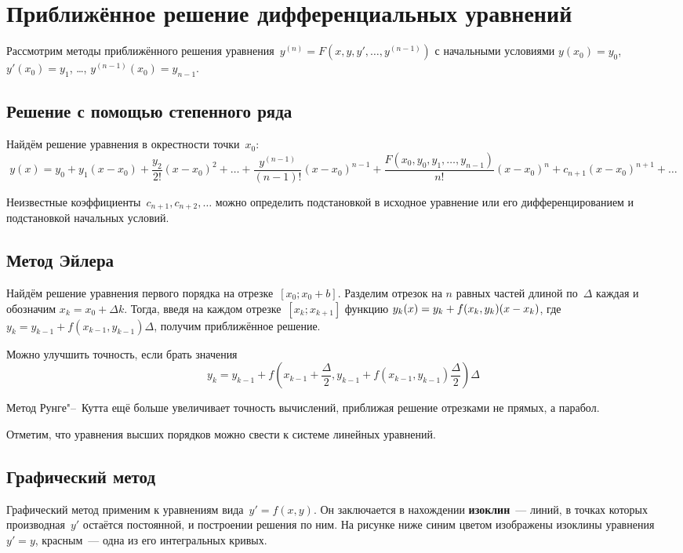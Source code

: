 \section{Приближённое решение дифференциальных уравнений}
Рассмотрим методы приближённого решения уравнения~$y^{(n)} = F(x, y, y', \ldots, y^{(n-1)})$ с начальными условиями $y(x_0) = y_0$, $y'(x_0) = y_1$, \ldots, $y^{(n-1)}(x_0) = y_{n-1}$.

\subsection{Решение с помощью степенного ряда}
Найдём решение уравнения в окрестности точки~$x_0$:
\begin{equation*}
y(x) = y_0 + y_1(x - x_0) + \frac{y_2}{2!} (x - x_0)^2 + \ldots + \frac{y^{(n-1)}}{(n - 1)!} (x - x_0)^{n-1} + \frac{F(x_0, y_0, y_1, \ldots, y_{n-1})}{n!} (x - x_0)^n + c_{n+1} (x - x_0)^{n+1} + \ldots
\end{equation*}

Неизвестные коэффициенты~$c_{n+1}, c_{n+2}, \ldots$ можно определить подстановкой в исходное уравнение или его дифференцированием и подстановкой начальных условий.

\subsection{Метод Эйлера}
 Найдём решение уравнения первого порядка на отрезке~$[x_0; x_0 + b]$.
Разделим отрезок на $n$ равных частей длиной по~$\Delta$ каждая и обозначим $x_k = x_0 + \Delta k$.
Тогда, введя на каждом отрезке~$[x_k; x_{k+1}]$ функцию $y_k(x) = y_k + f(x_k, y_k) \* (x - x_k)$, где $y_k = y_{k-1} + f(x_{k-1}, y_{k-1}) \Delta$, получим приближённое решение.

Можно улучшить точность, если брать значения
\begin{equation*}
y_k = y_{k-1} + f \left(x_{k-1} + \frac\Delta2, y_{k-1} + f(x_{k-1}, y_{k-1}) \frac\Delta2\right) \Delta
\end{equation*}

 Метод Рунге"--~Кутта ещё больше увеличивает точность вычислений, приближая решение отрезками не прямых, а парабол.

Отметим, что уравнения высших порядков можно свести к системе линейных уравнений.

\subsection{Графический метод}
 Графический метод применим к уравнениям вида~$y' = f(x, y)$.
 Он заключается в нахождении \textbf{изоклин}~--- линий, в точках которых производная~$y'$ остаётся постоянной, и построении решения по ним.
На рисунке ниже синим цветом изображены изоклины уравнения $y' = y$, красным~--- одна из его интегральных кривых.

